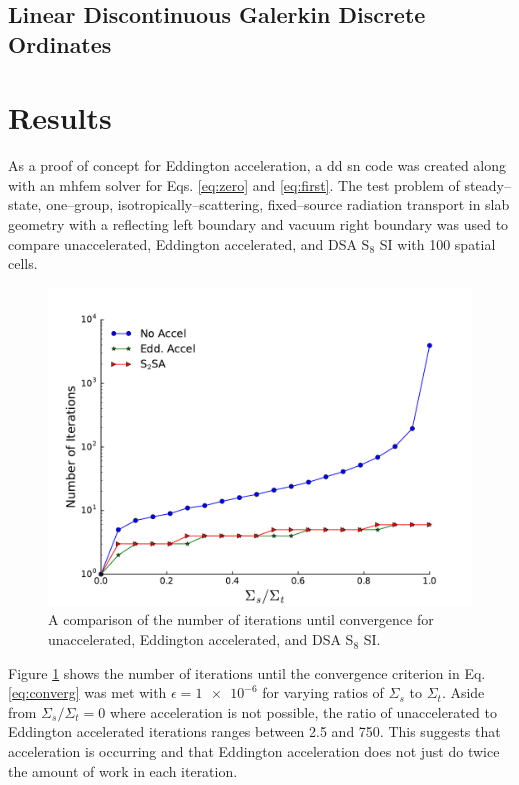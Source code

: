 \documentclass[11 pt]{article}
\begin{document}
\subsection{Linear Discontinuous Galerkin Discrete Ordinates}



\section{Results}
	As a proof of concept for Eddington acceleration, a \gls{dd} \gls{sn} code was created along with an \gls{mhfem} solver for Eqs. \ref{eq:zero} and \ref{eq:first}. The test problem of steady--state, one--group, isotropically--scattering, fixed--source radiation transport in slab geometry with a reflecting left boundary and vacuum right boundary was used to compare unaccelerated, Eddington accelerated, and DSA S$_8$ SI with 100 spatial cells. 

	\begin{figure} %
		\centering
		\includegraphics[width=5in]{accel.pdf}
		\caption{A comparison of the number of iterations until convergence for unaccelerated, Eddington accelerated, and DSA S$_8$ SI. }
		\label{fig:comparison}
	\end{figure}

	Figure \ref{fig:comparison} shows the number of iterations until the convergence criterion in  Eq. \ref{eq:converg} was met with $\epsilon = \num{1e-6}$ for varying ratios of $\Sigma_s$ to $\Sigma_t$. Aside from $\Sigma_s/\Sigma_t = 0$ where acceleration is not possible, the ratio of unaccelerated to Eddington accelerated iterations ranges between 2.5 and 750. This suggests that acceleration is occurring and that Eddington acceleration does not just do twice the amount of work in each iteration. 
\end{document}

